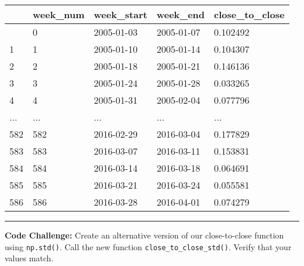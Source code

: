 \documentclass[
  letterpaper,
  DIV=11,
  numbers=noendperiod]{scrreprt}
\begin{document}
\begin{longtable}[]{@{}lllll@{}}
\toprule\noalign{}
& week\_num & week\_start & week\_end & close\_to\_close \\
\midrule\noalign{}
\endhead
\bottomrule\noalign{}
\endlastfoot
0 & 0 & 2005-01-03 & 2005-01-07 & 0.102492 \\
1 & 1 & 2005-01-10 & 2005-01-14 & 0.104307 \\
2 & 2 & 2005-01-18 & 2005-01-21 & 0.146136 \\
3 & 3 & 2005-01-24 & 2005-01-28 & 0.033265 \\
4 & 4 & 2005-01-31 & 2005-02-04 & 0.077796 \\
... & ... & ... & ... & ... \\
582 & 582 & 2016-02-29 & 2016-03-04 & 0.177829 \\
583 & 583 & 2016-03-07 & 2016-03-11 & 0.153831 \\
584 & 584 & 2016-03-14 & 2016-03-18 & 0.064691 \\
585 & 585 & 2016-03-21 & 2016-03-24 & 0.055581 \\
586 & 586 & 2016-03-28 & 2016-04-01 & 0.074279 \\
\end{longtable}

\begin{center}\rule{0.5\linewidth}{0.5pt}\end{center}

\textbf{Code Challenge:} Create an alternative version of our
close-to-close function using \texttt{np.std()}. Call the new function
\texttt{close\_to\_close\_std()}. Verify that your values match.
\end{document}

